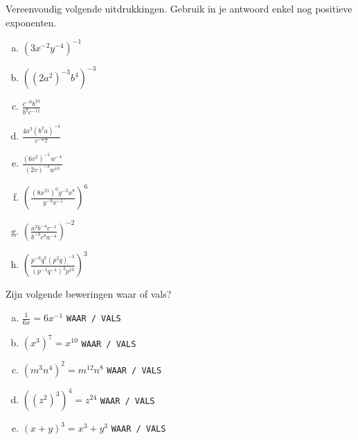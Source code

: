 \documentclass[12pt,twoside]{article}
\begin{document}
\begin{oefening}
Vereenvoudig volgende uitdrukkingen. Gebruik in je antwoord enkel nog positieve exponenten.
\begin{multicols}{2}
  \begin{enumerate}[(a)]
    \itemsep1em
  \item ${\left( {3{x^{ - 2}}{y^{ - 4}}} \right)^{ - 1}}$
  \item ${\left( {{{\left( {2{a^2}} \right)}^{ - 3}}{b^4}} \right)^{ - 3}}$
  \item $\displaystyle \frac{{{c^{ - 6}}{b^{10}}}}{{{b^9}{c^{ - 11}}}}$
  \item $\displaystyle \frac{{4{a^3}{{\left( {{b^2}a} \right)}^{ - 4}}}}{{{c^{ - 6} 7}}}$
\item $\displaystyle \frac{{{{\left( {6{v^2}} \right)}^{ - 1}}{w^{ - 4}}}}{{{{\left( {2v} \right)}^{ - 3}}{w^{10}}}}$
\item ${\left( {\displaystyle \frac{{{{\left( {8{x^{21}}} \right)}^0}{y^{ - 3}}{x^8}}}{{{y^{ - 9}}{x^{ - 1}}}}} \right)^6}$
\item ${\left( {\displaystyle \frac{{{a^2}{b^{ - 4}}{c^{ - 1}}}}{{{b^{ - 9}}{c^8}{a^{ - 4}}}}} \right)^{ - 2}}$
\item ${\left( {\displaystyle \frac{{{p^{ - 6}}{q^7}{{\left( {{p^2}q} \right)}^{ - 3}}}}{{{{\left( {{p^{ - 1}}{q^{ - 4}}} \right)}^2}{p^{10}}}}} \right)^3}$
\end{enumerate}
\end{multicols}
\end{oefening}

\begin{oefening}
  Zijn volgende beweringen waar of vals?
  \begin{enumerate}[(a)]
    \itemsep1em
  \item $\displaystyle \frac{1}{{6x}} = 6{x^{ - 1}}$ \hfill \texttt{WAAR / VALS}\mbox{\hspace{5cm}}
  \item ${\left( {{x^3}} \right)^7} = {x^{10}}$ \hfill \texttt{WAAR / VALS}\mbox{\hspace{5cm}}
  \item ${\left( {{m^3}{n^4}} \right)^2} = {m^{12}}{n^8}$ \hfill \texttt{WAAR / VALS}\mbox{\hspace{5cm}}
  \item ${\left( {{{\left( {{z^2}} \right)}^3}} \right)^4} = {z^{24}}$ \hfill \texttt{WAAR / VALS}\mbox{\hspace{5cm}}
  \item ${\left( {x + y} \right)^3} = {x^3} + {y^3}$ \hfill \texttt{WAAR / VALS}\mbox{\hspace{5cm}}
  \end{enumerate}
\end{oefening}
\end{document}
